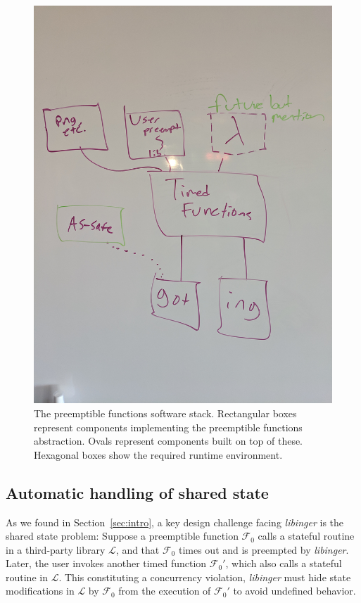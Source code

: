 \begin{figure}
\begin{center}
\includegraphics[width=0.75\columnwidth]{figs/architecture}
\end{center}
\caption{The preemptible functions software stack.  \textnormal{Rectangular boxes
represent components implementing the preemptible functions abstraction.  Ovals
represent components built on top of these.  Hexagonal boxes show the
required runtime environment.}}
\label{fig:architecture}
\end{figure}


\subsection{Automatic handling of shared state}

As we found in Section~\ref{sec:intro}, a key design challenge facing
\textit{libinger} is the shared state problem:  Suppose a preemptible function
$\mathcal{F}_0$ calls a stateful routine in a third-party library $\mathcal{L}$, and
that $\mathcal{F}_0$ times out and is preempted by \textit{libinger}.  Later, the
user invokes another timed function $\mathcal{F}_0'$, which also calls a stateful
routine in $\mathcal{L}$.  This constituting a concurrency violation,
\textit{libinger} must hide state modifications in $\mathcal{L}$ by $\mathcal{F}_0$
from the execution of $\mathcal{F}_0'$ to avoid undefined behavior.

